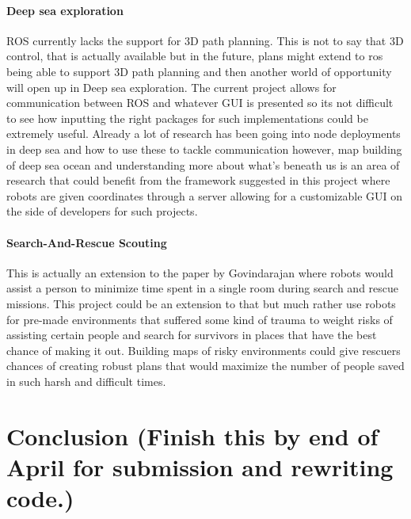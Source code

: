 \documentclass{report}
\begin{document}
      \subsubsection{Deep sea exploration}
        ROS currently lacks the support for 3D path planning. This is not to say that 3D control, that is actually available but in the future, plans might extend to ros being able to support 3D path planning and then another world of opportunity will open up in Deep sea exploration. The current project allows for communication between ROS and whatever GUI is presented so its not difficult to see how inputting the right packages for such implementations could be extremely useful. Already a lot of research has been going into node deployments in deep sea and how to use these to tackle communication however, map building of deep sea ocean and understanding more about what's beneath us is an area of research that could benefit from the framework suggested in this project where robots are given coordinates through a server allowing for a customizable GUI on the side of developers for such projects.

      \subsubsection{Search-And-Rescue Scouting}
        This is actually an extension to the paper by Govindarajan\cite{Vijay} where robots would assist a person to minimize time spent in a single room during search and rescue missions. This project could be an extension to that but much rather use robots for pre-made environments that suffered some kind of trauma to weight risks of assisting certain people and search for survivors in places that have the best chance of making it out. Building maps of risky environments could give rescuers chances of creating robust plans that would maximize the number of people saved in such harsh and difficult times.

  \chapter{Conclusion (Finish this by end of April for submission and rewriting code.)}
\end{document}
